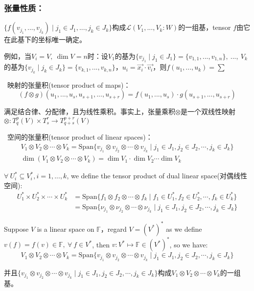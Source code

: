 \documentclass[zihao=-4,UTF8]{report}
\def\F{\mathbb{F}}
\theoremstyle{mystyle} %
\begin{document}
\subsubsection{张量性质：}
\par{} $\{f(v_{j_1},...,v_{j_k})\mid j_1 \in J_1,...,j_k \in J_k\}$构成$\mathscr{L}(V_1,...,V_k:W)$的一组基，tensor
 $f$由它在此基下的坐标唯一确定。 \par
{\par\color{gray}\small
例如，当$V_i=V,\ \dim V=n$时：设$V_1$的基为$\{v_{j_1}\mid j_1 \in J_1\}=\{v_{1,1},...,v_{1,n} \},\ ...,\ V_k$的基为$\{v_{j_k}\mid j_k \in J_k\}=\{v_{k,1},...,v_{k,n} \}$，$u_i=\vec{x_i}\cdot\vec{v_i}$，则$f(u_1,...,u_k)=\sum $
\par}

\  映射的张量积(tensor product of maps)：
\begin{equation*}
    (f \otimes g)(u_1,...,u_s,u_{s+1},...,u_{s+r}) = f(u_1,...,u_s)\cdot g(u_{s+1},...,u_{s+r})
\end{equation*}
{\par\color{gray}\small
满足结合律、分配律，且为线性乘积。事实上，张量乘积$\otimes$是一个双线性映射$\otimes: T^p_q(V)\times T^r_s \longrightarrow T^{p+r}_{q+s}(V)$\par}
\par
{}\ 空间的张量积(tensor product of linear spaces)： 
\begin{gather*}
    V_1 \otimes V_2 \otimes \cdots \otimes V_k = \text{Span}\{v_{j_1} \otimes v_{j_2} \otimes\cdots \otimes v_{j_k}\mid j_1\in J_1,j_2\in J_2,\cdots,j_k\in J_k\}\\ 
    \dim (V_1 \otimes V_2 \otimes \cdots \otimes V_k) = \dim V_1 \cdot \dim V_2 \cdots  \dim V_k
\end{gather*}
\par

{\par\color{gray}\small
$\forall\  U^*_i \subseteq V^*_i, i=1,...,k$, we define the tensor product of dual linear space(对偶线性空间): 
\begin{align*}
    U^*_1\times U^*_2\times \cdots \times U^*_k &= \text{Span}\{f_1 \otimes f_2 \otimes \cdots \otimes f_k \mid f_1 \in U^*_1, f_2 \in U^*_2, \cdots, f_k \in U^*_k\}\\
    &=\text{Span}\{\nu_{j_1} \otimes\nu_{j_2} \otimes\cdots \otimes\nu_{j_k}\mid j_1\in J_1,j_2\in J_2,\cdots,j_k\in J_k\}
\end{align*}

Suppose $V$ is a linear space on $\F$，regard $V = (V^*)^*$ as we define $v(f) = f(v) \in \F,\ \forall\ f \in V^*$, then $v: V^* \longmapsto \F \in (V^*)^*$, so we have:
\begin{equation*}
    V_1 \otimes V_2 \otimes \cdots \otimes V_k = \text{Span}\{v_{j_1} \otimes v_{j_2} \otimes\cdots \otimes v_{j_k}\mid j_1\in J_1,j_2\in J_2,\cdots,j_k\in J_k\}
\end{equation*}

并且$\{v_{j_1} \otimes v_{j_2} \otimes\cdots \otimes v_{j_k}\mid j_1\in J_1,j_2\in J_2,\cdots,j_k\in J_k\}$构成$V_1 \otimes V_2 \otimes \cdots \otimes V_k$的一组基。
\par}
\end{document}
